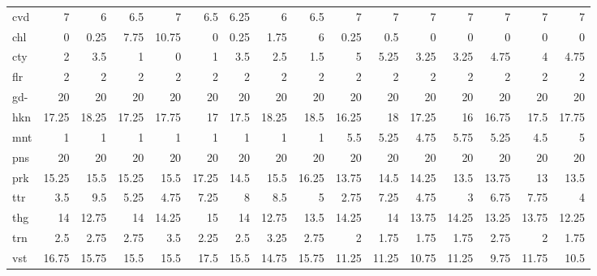 \begin{center}
\begin{tabular}{lrrrrrrrrrrrrrrr}
cvd & 7 & 6 & 6.5 & 7 & 6.5 & 6.25 & 6 & 6.5 & 7 & 7 & 7 & 7 & 7 & 7 & 7\\
chl & 0 & 0.25 & 7.75 & 10.75 & 0 & 0.25 & 1.75 & 6 & 0.25 & 0.5 & 0 & 0 & 0 & 0 & 0\\
cty & 2 & 3.5 & 1 & 0 & 1 & 3.5 & 2.5 & 1.5 & 5 & 5.25 & 3.25 & 3.25 & 4.75 & 4 & 4.75\\
flr & 2 & 2 & 2 & 2 & 2 & 2 & 2 & 2 & 2 & 2 & 2 & 2 & 2 & 2 & 2\\
gd- & 20 & 20 & 20 & 20 & 20 & 20 & 20 & 20 & 20 & 20 & 20 & 20 & 20 & 20 & 20\\
hkn & 17.25 & 18.25 & 17.25 & 17.75 & 17 & 17.5 & 18.25 & 18.5 & 16.25 & 18 & 17.25 & 16 & 16.75 & 17.5 & 17.75\\
mnt & 1 & 1 & 1 & 1 & 1 & 1 & 1 & 1 & 5.5 & 5.25 & 4.75 & 5.75 & 5.25 & 4.5 & 5\\
pns & 20 & 20 & 20 & 20 & 20 & 20 & 20 & 20 & 20 & 20 & 20 & 20 & 20 & 20 & 20\\
prk & 15.25 & 15.5 & 15.25 & 15.5 & 17.25 & 14.5 & 15.5 & 16.25 & 13.75 & 14.5 & 14.25 & 13.5 & 13.75 & 13 & 13.5\\
ttr & 3.5 & 9.5 & 5.25 & 4.75 & 7.25 & 8 & 8.5 & 5 & 2.75 & 7.25 & 4.75 & 3 & 6.75 & 7.75 & 4\\
thg & 14 & 12.75 & 14 & 14.25 & 15 & 14 & 12.75 & 13.5 & 14.25 & 14 & 13.75 & 14.25 & 13.25 & 13.75 & 12.25\\
trn & 2.5 & 2.75 & 2.75 & 3.5 & 2.25 & 2.5 & 3.25 & 2.75 & 2 & 1.75 & 1.75 & 1.75 & 2.75 & 2 & 1.75\\
vst & 16.75 & 15.75 & 15.5 & 15.5 & 17.5 & 15.5 & 14.75 & 15.75 & 11.25 & 11.25 & 10.75 & 11.25 & 9.75 & 11.75 & 10.5\\
\end{tabular}
\end{center}


